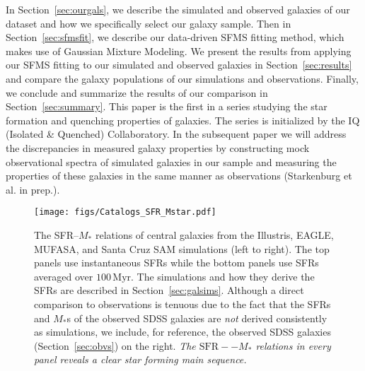 \documentclass[preprint2,tighten]{aastex62}
\begin{document}
In Section~\ref{sec:ourgals}, we describe the simulated and observed 
galaxies of our dataset and how we specifically select our galaxy sample. 
Then in Section~\ref{sec:sfmsfit}, we describe our data-driven SFMS 
fitting method, which makes use of Gaussian Mixture Modeling. We present 
the results from applying our SFMS fitting to our simulated and observed
galaxies in Section~\ref{sec:results} and compare the galaxy populations
of our simulations and observations. Finally, we conclude and summarize
the results of our comparison in Section~\ref{sec:summary}.
This paper is the first in a series studying the star formation and 
quenching properties of galaxies. The series is initialized by the 
IQ (Isolated \& Quenched) Collaboratory. %
In the subsequent paper we will address the discrepancies in measured 
galaxy properties by constructing mock observational spectra of simulated 
galaxies in our sample and measuring the properties of these galaxies
in the same manner as observations (Starkenburg et al. in prep.).

\begin{figure*}
\begin{center}
\texttt{[image: figs/Catalogs\_SFR\_Mstar.pdf]} 
\caption{The SFR--$M_*$ relations of central galaxies from the Illustris, 
EAGLE, MUFASA, and Santa Cruz SAM simulations (left to right). The 
top panels use instantaneous SFRs while the bottom panels use SFRs 
averaged over $100\,\mathrm{Myr}$. The simulations and how they derive 
the SFRs are described in Section~\ref{sec:galsims}. Although a
direct comparison to observations is tenuous due to the fact that 
the SFRs and $M_*$s of the observed SDSS galaxies are \emph{not} 
derived consistently as simulations, we include, for reference, the 
observed  SDSS galaxies (Section~\ref{sec:obvs}) on the right. 
\emph{The $\mathrm{SFR}--M_*$ relations in every panel reveals a 
clear star forming main sequence.}} 
\label{fig:sfrmstar}
\end{center}
\end{figure*}
\end{document}
